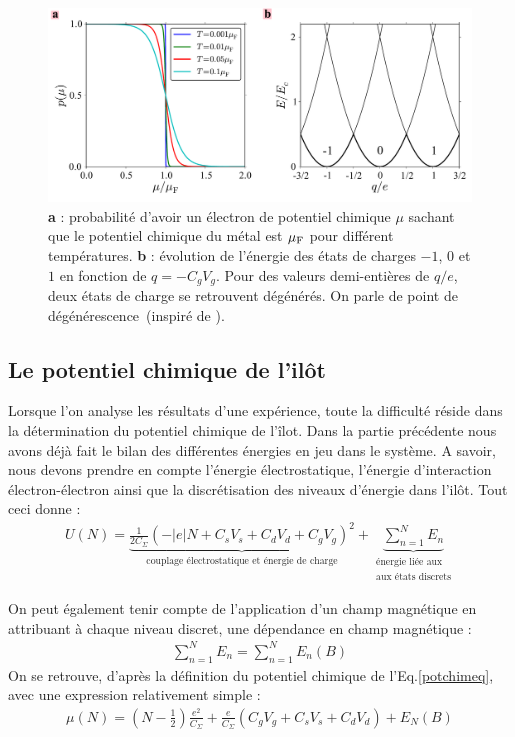 \begin{figure}
\centering \includegraphics[scale=0.5]{Theorie/Transport/figure2/figure2.pdf} 
\caption{ \textbf{a} : probabilité d'avoir un électron de potentiel chimique $\mu$ sachant que le potentiel chimique du métal est $\mu_{\rm{F}}$ pour différent températures. \textbf{b} : évolution de l'énergie des états de charges $-1$, $0$ et $1$ en fonction de $q = -C_gV_g$. Pour des valeurs demi-entières de $q/e$, deux états de charge se retrouvent dégénérés. On parle de point de dégénérescence~(inspiré de \cite{NazaBook}).}
\label{distrib_fermi}
\end{figure}



\subsection{Le potentiel chimique de l'il\^ot}
Lorsque l'on analyse les résultats d'une expérience, toute la difficulté réside dans la détermination du potentiel chimique de l'\^ilot. Dans la partie précédente nous avons déjà fait le bilan des différentes énergies en jeu dans le système. A savoir, nous devons prendre en compte l'énergie électrostatique, l'énergie d'interaction électron-électron ainsi que la discrétisation des niveaux d'énergie dans l'il\^ot. Tout ceci donne :
\begin{eqnarray}
U(N) = \underbrace{\frac{1}{2C_{\Sigma}} (-|e|N + C_sV_s + C_dV_d + C_gV_g)^2}_{\text{couplage électrostatique et énergie de charge}}
+ 
\underbrace{\sum_{n=1}^{N} E_n}_{\substack{\text{énergie liée aux} \\\text{aux états discrets}}}
\end{eqnarray}

On peut également tenir compte de l'application d'un champ magnétique en attribuant à chaque niveau discret, une dépendance en champ magnétique :
\begin{eqnarray}
\sum_{n=1}^N E_n = \sum_{n=1}^N E_n(B) \nonumber
\end{eqnarray}
On se retrouve, d'après la définition du potentiel chimique de l'Eq.\ref{potchimeq}, avec une expression relativement simple :
\begin{eqnarray}
\mu(N) = (N-\frac{1}{2})\frac{e^2}{C_{\Sigma}}
+ 
\frac{e}{C_{\Sigma}}(C_gV_g + C_sV_s + C_dV_d)
+
E_N(B)
\end{eqnarray}

